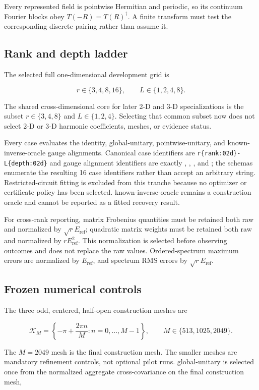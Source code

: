 \documentclass[11pt]{article}
\begin{document}
Every represented field is pointwise Hermitian and periodic, so its continuum Fourier
blocks obey $T(-R)=T(R)^\dagger$. A finite transform must test the corresponding discrete
pairing rather than assume it.

\subsection{Rank and depth ladder}

The selected full one-dimensional development grid is

\[
r\in\{3,4,8,16\},
\qquad
L\in\{1,2,4,8\}.
\]

The shared cross-dimensional core for later 2-D and 3-D specializations is the subset
$r\in\{3,4,8\}$ and $L\in\{1,2,4\}$. Selecting that common subset now does not select
2-D or 3-D harmonic coefficients, meshes, or evidence status.

Every case evaluates the identity, global-unitary, pointwise-unitary, and
known-inverse-oracle gauge alignments. Canonical case identifiers are
\texttt{r\{rank:02d\}-L\{depth:02d\}} and gauge alignment identifiers are exactly , , , and
; the schemas enumerate the resulting 16 case identifiers rather than accept an
arbitrary string. Restricted-circuit fitting is excluded from this tranche because no
optimizer or certificate policy has been selected. known-inverse-oracle remains a construction oracle and
cannot be reported as a fitted recovery result.

For cross-rank reporting, matrix Frobenius quantities must be retained both raw and
normalized by $\sqrt rE_{\mathrm{ref}}$; quadratic matrix weights must be retained both
raw and normalized by $rE_{\mathrm{ref}}^2$. This normalization is selected before
observing outcomes and does not replace the raw values. Ordered-spectrum maximum errors
are normalized by $E_{\mathrm{ref}}$, and spectrum RMS errors by
$\sqrt rE_{\mathrm{ref}}$.

\subsection{Frozen numerical controls}

The three odd, centered, half-open construction meshes are

\[
\mathcal K_M=\left\{-\pi+\frac{2\pi n}{M}:n=0,\ldots,M-1\right\},
\qquad M\in\{513,1025,2049\}.
\]

The $M=2049$ mesh is the final construction mesh. The smaller meshes are mandatory
refinement controls, not optional pilot runs. global-unitary is selected once from the normalized
aggregate cross-covariance on the final construction mesh,
\end{document}
